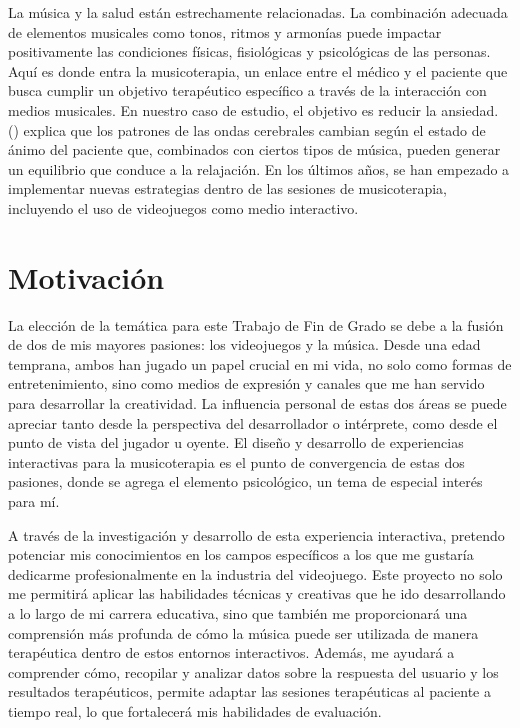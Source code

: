La música y la salud están estrechamente relacionadas. La combinación adecuada de elementos musicales como tonos, ritmos y armonías puede impactar positivamente las condiciones físicas, fisiológicas y psicológicas de las personas. Aquí es donde entra la musicoterapia, un enlace entre el médico y el paciente que busca cumplir un objetivo terapéutico específico a través de la interacción con medios musicales. En nuestro caso de estudio, el objetivo es reducir la ansiedad. \citeauthor{KTN:2011} (\citeyear{KTN:2011}) explica que los patrones de las ondas cerebrales cambian según el estado de ánimo del paciente que, combinados con ciertos tipos de música, pueden generar un equilibrio que conduce a la relajación. En los últimos años, se han empezado a implementar nuevas estrategias dentro de las sesiones de musicoterapia, incluyendo el uso de videojuegos como medio interactivo.

\section{Motivación}

La elección de la temática para este Trabajo de Fin de Grado se debe a la fusión de dos de mis mayores pasiones: los videojuegos y la música. Desde una edad temprana, ambos han jugado un papel crucial en mi vida, no solo como formas de entretenimiento, sino como medios de expresión y canales que me han servido para desarrollar la creatividad. La influencia personal de estas dos áreas se puede apreciar tanto desde la perspectiva del desarrollador o intérprete, como desde el punto de vista del jugador u oyente. El diseño y desarrollo de experiencias interactivas para la musicoterapia es el punto de convergencia de estas dos pasiones, donde se agrega el elemento psicológico, un tema de especial interés para mí. 

A través de la investigación y desarrollo de esta experiencia interactiva, pretendo potenciar mis conocimientos en los campos específicos a los que me gustaría dedicarme profesionalmente en la industria del videojuego. Este proyecto no solo me permitirá aplicar las habilidades técnicas y creativas que he ido desarrollando a lo largo de mi carrera educativa, sino que también me proporcionará una comprensión más profunda de cómo la música puede ser utilizada de manera terapéutica dentro de estos entornos interactivos. Además, me ayudará a comprender cómo, recopilar y analizar datos sobre la respuesta del usuario y los resultados terapéuticos, permite adaptar las sesiones terapéuticas al paciente a tiempo real, lo que fortalecerá mis habilidades de evaluación.

